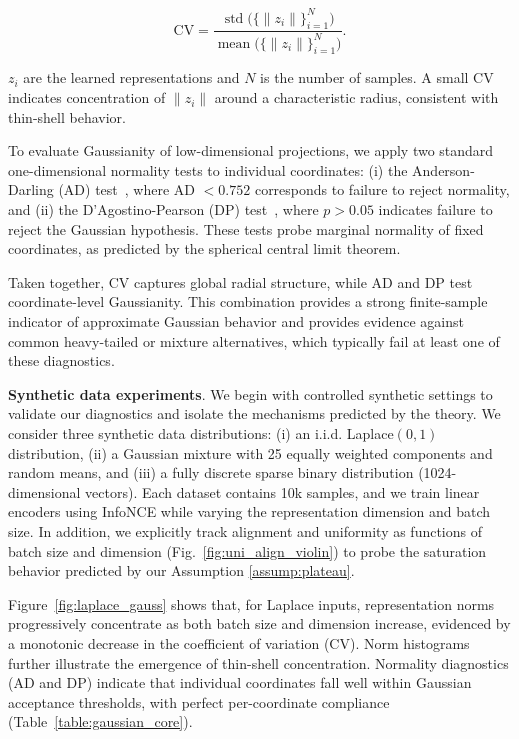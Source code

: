 \documentclass{article}
\begin{document}
\begin{equation}
\label{eq:cv-radius}
\mathrm{CV}
=
\frac{\operatorname{std}\!\bigl(\{\lVert z_i\rVert\}_{i=1}^N\bigr)}
     {\operatorname{mean}\!\bigl(\{\lVert z_i\rVert\}_{i=1}^N\bigr)} .
\end{equation}

$z_i$ are the learned representations and $N$ is the number of samples. A small CV indicates concentration of $\|z_i\|$ around a characteristic radius, consistent with thin-shell behavior.

To evaluate Gaussianity of low-dimensional projections, we apply two standard one-dimensional normality tests to individual coordinates:
(i) the Anderson-Darling (AD) test~\citep{anderson1954test}, where AD $< 0.752$ corresponds to failure to reject normality, and
(ii) the D’Agostino-Pearson (DP) test~\citep{d1973tests}, where $p>0.05$ indicates failure to reject the Gaussian hypothesis.
These tests probe marginal normality of fixed coordinates, as predicted by the spherical central limit theorem.

Taken together, CV captures global radial structure, while AD and DP test coordinate-level Gaussianity.
This combination provides a strong finite-sample indicator of approximate Gaussian behavior and provides evidence against common heavy-tailed or mixture alternatives, which typically fail at least one of these diagnostics.


\textbf{Synthetic data experiments}.
We begin with controlled synthetic settings to validate our diagnostics and isolate the mechanisms predicted by the theory.
We consider three synthetic data distributions: (i) an i.i.d. Laplace$(0,1)$ distribution, (ii) a Gaussian mixture with 25 equally weighted components and random means, and (iii) a fully discrete sparse binary distribution (1024-dimensional vectors). Each dataset contains 10k samples, and we train linear encoders using InfoNCE while varying the representation dimension and batch size.
In addition, we explicitly track alignment and uniformity as functions of batch size and dimension (Fig.~\ref{fig:uni_align_violin}) to probe the saturation behavior predicted by our Assumption \ref{assump:plateau}.
% 

Figure~\ref{fig:laplace_gauss} shows that, for Laplace inputs, representation norms progressively concentrate as both batch size and dimension increase, evidenced by a monotonic decrease in the coefficient of variation (CV). Norm histograms further illustrate the emergence of thin-shell concentration.
Normality diagnostics (AD and DP) indicate that individual coordinates fall well within Gaussian acceptance thresholds, with perfect per-coordinate compliance (Table~\ref{table:gaussian_core}).
\end{document}
